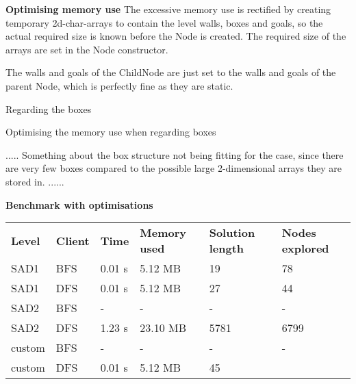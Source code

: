 \documentclass[Main]{subfiles}
\begin{document}
\textbf{Optimising memory use}
The excessive memory use is rectified by creating temporary 2d-char-arrays to contain the level walls, boxes and goals, so the actual required size is known before the Node is created. The required size of the arrays are set in the Node constructor. 

The walls and goals of the ChildNode are just set to the walls and goals of the parent Node, which is perfectly fine as they are static. 

Regarding the boxes 

Optimising the memory use when regarding boxes



..... Something about the box structure not being fitting for the case, since there are very few boxes compared to the possible large 2-dimensional arrays they are stored in.  ......


\textbf{Benchmark with optimisations}

\begin{table}[h]
\begin{tabular}{llllll}
\rowcolor[HTML]{EFEFEF} 
\textbf{Level} & \textbf{Client} & \textbf{Time} & \textbf{Memory used} & \textbf{Solution length} & \textbf{Nodes explored} \\
SAD1           & BFS             & 0.01 s        & 5.12 MB              & 19                       & 78                      \\
SAD1           & DFS             & 0.01 s        & 5.12 MB              & 27                       & 44                      \\
SAD2           & BFS             & -           & -                  & -                      & -                     \\
SAD2           & DFS             & 1.23 s        & 23.10 MB             & 5781                     & 6799                    \\
custom         & BFS             & -           & -                  & -                      & -                     \\
custom         & DFS             & 0.01 s        & 5.12 MB              & 45                       &                        
\end{tabular}
\end{table}
\end{document}
